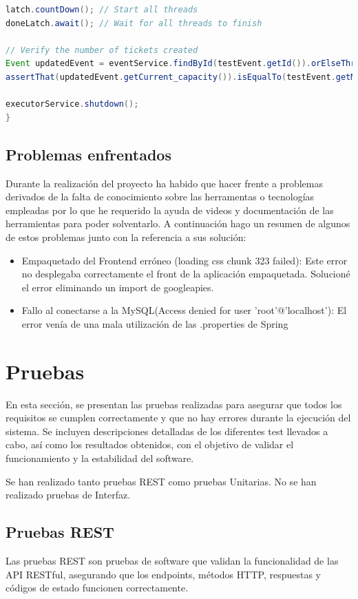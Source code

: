 \begin{lstlisting}[language=Java, caption=Función buyTicket, label=lst:testConcurrencia]
latch.countDown(); // Start all threads
doneLatch.await(); // Wait for all threads to finish

// Verify the number of tickets created
Event updatedEvent = eventService.findById(testEvent.getId()).orElseThrow();
assertThat(updatedEvent.getCurrent_capacity()).isEqualTo(testEvent.getMax_capacity());

executorService.shutdown();
}
\end{lstlisting}



\subsection{Problemas enfrentados}
Durante la realización del proyecto ha habido que hacer frente a problemas derivados de la falta de conocimiento sobre las herramentas o tecnologías empleadas
por lo que he requerido la ayuda de videos y documentación de las herramientas para poder solventarlo. A continuación hago un resumen de algunos de estos problemas junto
con la referencia a sus solución:
\begin{itemize}
    \item  Empaquetado del Frontend erróneo (loading css chunk 323 failed)\cite{cssChunk}: Este error no desplegaba correctamente el front de la aplicación empaquetada.
     Solucioné el error eliminando un import de googleapies.
    \item  Fallo al conectarse a la MySQL(Access denied for user 'root'@'localhost')\cite{mysql}: El error venía de una mala utilización de las .properties de 
     Spring 
\end{itemize}

\section{Pruebas}
En esta sección, se presentan las pruebas realizadas para asegurar que todos los requisitos se cumplen correctamente y que no hay errores durante la ejecución del 
sistema. Se incluyen descripciones detalladas de los diferentes test llevados a cabo, así como los resultados obtenidos, con el objetivo de validar el 
funcionamiento y la estabilidad del software.

Se han realizado tanto pruebas REST como pruebas Unitarias. No se han realizado pruebas de Interfaz.

\subsection{Pruebas REST}
Las pruebas REST son pruebas de software que validan la funcionalidad de las API RESTful, asegurando que los endpoints, métodos HTTP, respuestas y códigos de 
estado funcionen correctamente.

